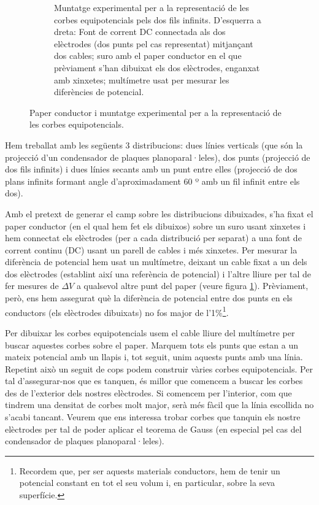 \documentclass[a4paper,10.5pt]{report}
\begin{document}
\begin{figure}[h]
\begin{subfigure}{0.45\textwidth}
		\caption{Muntatge experimental per a la representació de les corbes equipotencials pels dos fils infinits. D'esquerra a dreta: Font de corrent DC connectada als dos elèctrodes (dos punts pel cas representat) mitjançant dos cables; suro amb el paper conductor en el que prèviament s'han dibuixat els dos elèctrodes, enganxat amb xinxetes; multímetre usat per mesurar les diferències de potencial.}
		\label{fig1.1b}
	\end{subfigure}
	\caption{Paper conductor i muntatge experimental per a la representació de les corbes equipotencials.}
	\label{fig1.1}
\end{figure}

Hem treballat amb les següents 3 distribucions: dues línies verticals (que són la projecció d'un condensador de plaques planoparal·leles), dos punts (projecció de dos fils infinits) i dues línies secants amb un punt entre elles (projecció de dos plans infinits formant angle d'aproximadament 60 º amb un fil infinit entre els dos).

Amb el pretext de generar el camp sobre les distribucions dibuixades, s'ha fixat el paper conductor (en el qual hem fet els dibuixos) sobre un suro usant xinxetes i hem connectat els elèctrodes (per a cada distribució per separat) a una font de corrent continu (DC) usant un parell de cables i més xinxetes. Per mesurar la diferència de potencial hem usat un multímetre, deixant un cable fixat a un dels dos elèctrodes (establint així una referència de potencial) i l'altre lliure per tal de fer mesures de $\Delta V$ a qualsevol altre punt del paper (veure figura \ref{fig1.1b}). Prèviament, però, ens hem assegurat què la diferència de potencial entre dos punts en els conductors (els elèctrodes dibuixats) no fos major de l'1\%\footnote{Recordem que, per ser aquests materials conductors, hem de tenir un potencial constant en tot el seu volum i, en particular, sobre la seva superfície.}.

Per dibuixar les corbes equipotencials usem el cable lliure del multímetre per buscar aquestes corbes sobre el paper. Marquem tots els punts que estan a un mateix potencial amb un llapis i, tot seguit, unim aquests punts amb una línia. Repetint això un seguit de cops podem construir vàries corbes equipotencials. Per tal d'assegurar-nos que es tanquen, és millor que comencem a buscar les corbes des de l'exterior dels nostres elèctrodes. Si comencem per l'interior, com que tindrem una densitat de corbes molt major, serà més fàcil que la línia escollida no s'acabi tancant. Veurem que ens interessa trobar corbes que tanquin els nostre elèctrodes per tal de poder aplicar el teorema de Gauss (en especial pel cas del condensador de plaques planoparal·leles).
\end{document}
